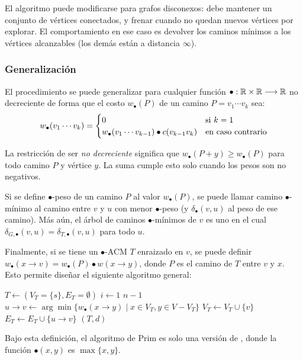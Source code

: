 El algoritmo puede modificarse para grafos disconexos: debe mantener un conjunto de vértices conectados, y frenar cuando no quedan nuevos vértices por explorar. El comportamiento en ese caso es devolver los caminos mínimos a los vértices alcanzables (los demás están a distancia $\infty$).

\subsubsection{Generalización}

El procedimiento se puede generalizar para cualquier función $\bullet: \mathbb{R} \times \mathbb{R} \longrightarrow \mathbb{R}$ no decreciente de forma que el costo $w_\bullet(P)$ de un camino $P = v_1 \cdots v_k$ sea:
$$
    w_\bullet(v_1 \cdots v_k) =
    \begin{cases}
        0                                                    & \text{si } k = 1 \\
        w_\bullet(v_1 \cdots v_{k-1}) \bullet c(v_{k-1} v_k) & \text{en caso contrario}
    \end{cases}
$$

La restricción de ser \textit{no decreciente} significa que $w_\bullet(P + y) \geq w_\bullet(P)$ para todo camino $P$ y vértice $y$. La suma cumple esto solo cuando los pesos son no negativos.

Si se define $\bullet$-peso de un camino $P$ al valor $w_\bullet(P)$, se puede llamar camino $\bullet$-mínimo al camino entre $v$ y $u$ con menor $\bullet$-peso (y $\delta_\bullet(v, u)$ al peso de ese camino). Más aún, el árbol de caminos $\bullet$-mínimos de $v$ es uno en el cual $\delta_{G,\bullet}(v, u) = \delta_{T, \bullet}(v, u)$ para todo $u$.

Finalmente, si se tiene un $\bullet$-ACM $T$ enraizado en $v$, se puede definir $w_\bullet(x \rightarrow v) = w_\bullet(P) \bullet w(x \rightarrow y)$, donde $P$ es el camino de $T$ entre $v$ y $x$. Esto permite diseñar el siguiente algoritmo general:

\begin{codebox}
    \li $T \gets (V_T = \{s\}, E_T = \emptyset)$
    \li \For $i \gets 1$ \To $n - 1$ \Do
    \li $u \rightarrow v \gets \arg\min{\{w_\bullet(x \rightarrow y) \mid x \in V_T, y \in V - V_T\}}$
    \li $V_T \gets V_T \cup \{v\}$
    \li $E_T \gets E_T \cup \{u \rightarrow v\}$
    \End
    \li \Return $(T, d)$
\end{codebox}

Bajo esta definición, el algoritmo de Prim es solo una versión de , donde la función $\bullet(x, y)$ es $\max{\{x, y\}}$.

